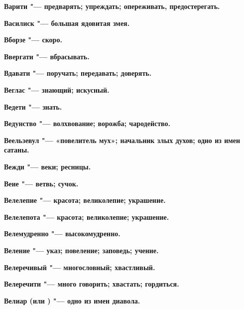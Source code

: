 \begin{mymulticols}{2}
\bfseries Варити\normalfont{} "--- предварять; упреждать; опереживать, предостерегать. 




\bfseries Василиск\normalfont{} "--- большая ядовитая змея. 




\bfseries Вборзе\normalfont{} "--- скоро. 




\bfseries Ввергати\normalfont{} "--- вбрасывать. 




\bfseries Вдавати\normalfont{} "--- поручать; передавать; доверять. 




\bfseries Веглас\normalfont{} "--- знающий; искусный. 




\bfseries Ведети\normalfont{} "--- знать. 




\bfseries Ведунство\normalfont{} "--- волхвование; ворожба; чародейство. 




\bfseries Веельзевул\normalfont{} "--- «повелитель мух»; начальник злых духов; одно из имен сатаны. 




\bfseries Вежди\normalfont{} "--- веки; ресницы. 




\bfseries Веие\normalfont{} "--- ветвь; сучок. 




\bfseries Велелепие\normalfont{} "--- красота; великолепие; украшение. 




\bfseries Велелепота\normalfont{} "--- красота; великолепие; украшение. 




\bfseries Велемудренно\normalfont{} "--- высокомудренно. 




\bfseries Веление\normalfont{} "--- указ; повеление; заповедь; учение. 




\bfseries Велеречивый\normalfont{} "--- многословный; хвастливый. 




\bfseries Велеречити\normalfont{} "--- много говорить; хвастать; гордиться. 




\bfseries Велиар\normalfont{} (или \normalfont{}) "--- одно из имен диавола. 





\end{mymulticols}
